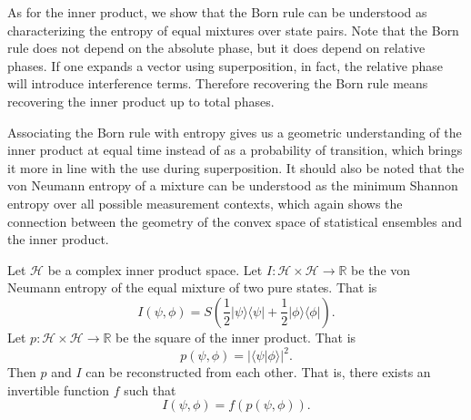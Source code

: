 \documentclass[10pt,twocolumn, nofootinbib]{revtex4-2}
\def\>{\rangle}
\def\<{\langle}
\begin{document}
As for the inner product, we show that the Born rule can be understood as characterizing the entropy of equal mixtures over state pairs. Note that the Born rule does not depend on the absolute phase, but it does depend on relative phases. If one expands a vector using superposition, in fact, the relative phase will introduce interference terms. Therefore recovering the Born rule means recovering the inner product up to total phases.

Associating the Born rule with entropy gives us a geometric understanding of the inner product at equal time instead of as a probability of transition, which brings it more in line with the use during superposition. It should also be noted that the von Neumann entropy of a mixture can be understood as the minimum Shannon entropy over all possible measurement contexts,\cite{nielsen_chuang_2010} which again shows the connection between the geometry of the convex space of statistical ensembles and the inner product.

\begin{prop}\label{prop_innerProductIsEntropy}
Let $\mathcal{H}$ be a complex inner product space. Let $I : \mathcal{H} \times \mathcal{H} \to \mathbb{R}$ be the von Neumann entropy of the equal mixture of two pure states. That is
\begin{equation}
I(\psi, \phi) = S\left(\frac{1}{2}|\psi\>\<\psi| + \frac{1}{2}|\phi\>\<\phi|\right).
\end{equation}
Let $p : \mathcal{H} \times \mathcal{H} \to \mathbb{R}$ be the square of the inner product. That is
\begin{equation}
p(\psi, \phi) = |\<\psi| \phi\>|^2.
\end{equation}
Then $p$ and $I$ can be reconstructed from each other. That is, there exists an invertible function $f$ such that
\begin{equation}
I(\psi, \phi) = f(p(\psi, \phi)).
\end{equation}
\end{prop}
\end{document}
